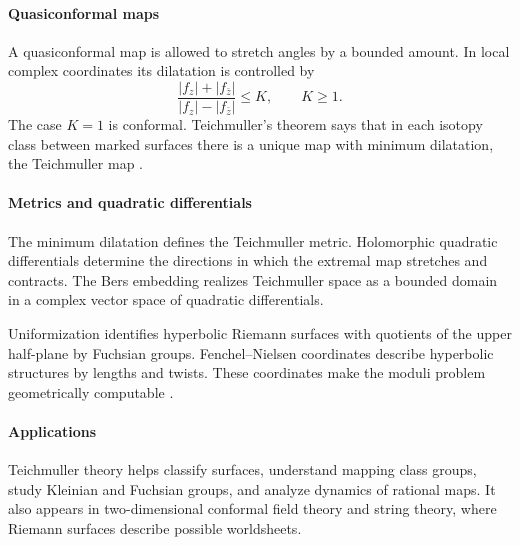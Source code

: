 \paragraph{Quasiconformal maps}
A quasiconformal map is allowed to stretch angles by a bounded amount. In local complex coordinates its dilatation is controlled by
\[
\frac{|f_z|+|f_{\bar z}|}{|f_z|-|f_{\bar z}|}\leq K,\qquad K\geq1.
\]
The case $K=1$ is conformal. Teichmuller's theorem says that in each isotopy class between marked surfaces there is a unique map with minimum dilatation, the Teichmuller map \cite{teich_ref3}.

\paragraph{Metrics and quadratic differentials}
The minimum dilatation defines the Teichmuller metric. Holomorphic quadratic differentials determine the directions in which the extremal map stretches and contracts. The Bers embedding realizes Teichmuller space as a bounded domain in a complex vector space of quadratic differentials.

Uniformization identifies hyperbolic Riemann surfaces with quotients of the upper half-plane by Fuchsian groups. Fenchel--Nielsen coordinates describe hyperbolic structures by lengths and twists. These coordinates make the moduli problem geometrically computable \cite{teich_ref4}.

\paragraph{Applications}
Teichmuller theory helps classify surfaces, understand mapping class groups, study Kleinian and Fuchsian groups, and analyze dynamics of rational maps. It also appears in two-dimensional conformal field theory and string theory, where Riemann surfaces describe possible worldsheets.

